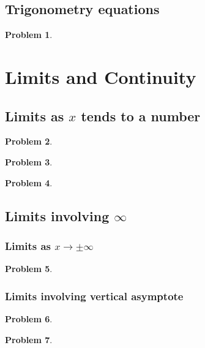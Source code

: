 \documentclass{article}
\newtheorem{problem}{Problem}
\begin{document}
\subsection{Trigonometry equations}
\begin{problem}

\end{problem}


\section{Limits and Continuity}
\subsection{Limits as $x$ tends to a number}\label{secMPSlimitsXtendsToNumer}
\begin{problem}

\end{problem}

\begin{problem}

\end{problem}
\begin{problem}

\end{problem}
\subsection{Limits involving $\infty $}
\subsubsection{Limits as $x\to\pm \infty$}\label{secMPSlimitsXtoInfty}
\begin{problem}

\end{problem}


\subsubsection{Limits involving vertical asymptote}\label{secMPSlimitsVerticalAsymptote}
\begin{problem}

\end{problem}
\begin{problem}

\end{problem}

\end{document}
